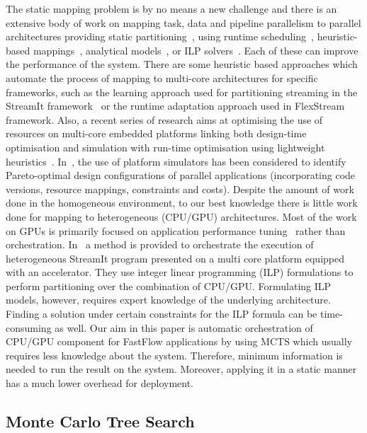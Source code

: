 \documentclass[smallextended]{svjour3}
\begin{document}
\noindent
The static mapping problem is by no means a new challenge and there is an extensive body
of work on mapping task, data and pipeline parallelism to
parallel architectures providing static
partitioning~\cite{kwok1999static,saraswat2007x10,subhlok1993exploiting}, using runtime scheduling~\cite{distributed1984dynamic}, heuristic-based
mappings~\cite{gordon2006exploiting}, analytical models~\cite{culler1996logp,navarro2009analytical}, 
or ILP solvers~\cite{kudlur2008orchestrating}. Each of these can improve the performance of the system.
There are some heuristic based approaches which automate the process of mapping to multi-core architectures for specific frameworks, such as 
the learning approach used for partitioning streaming in the StreamIt framework~\cite{wang2010partitioning} or the runtime adaptation 
approach used in FlexStream~\cite{hormati2009flextream} framework. Also, a recent series of research aims at 
optimising the use of resources on multi-core embedded platforms linking both design-time optimisation and simulation with run-time optimisation using lightweight 
heuristics~\cite{ykman2010exploration,ykman2007design,ykman2011linking}. In~\cite{avasare2010practical}, the use of 
platform simulators has been considered 
to identify Pareto-optimal design configurations of parallel applications 
(incorporating code versions, resource mappings, constraints and costs).
Despite the amount of work done in the homogeneous environment, to our best knowledge there is little work done for mapping to 
heterogeneous (CPU/GPU) architectures. Most of the work on GPUs is primarily focused on application performance 
tuning~\cite{agrawal2005optimizing} rather than orchestration.
In~\cite{udupa2009software} a method is provided to orchestrate the execution of heterogeneous StreamIt program presented 
on a multi core platform equipped with an accelerator. They use integer
linear programming (ILP) formulations to perform partitioning over the combination of CPU/GPU.
Formulating ILP models, however, requires expert
knowledge of the underlying architecture. Finding a
solution under certain constraints for the ILP formula can
be time-consuming as well.
Our aim in this paper is automatic orchestration of CPU/GPU component for FastFlow applications by using MCTS which usually requires less knowledge
about the system. Therefore, minimum information is needed to run the result on the system. Moreover, applying it in a static manner has a much lower overhead
for deployment.

\subsection{Monte Carlo Tree Search}
\end{document}
